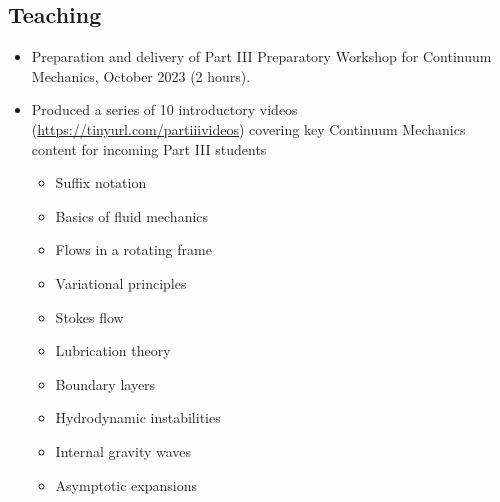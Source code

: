 \documentclass[a4paper]{article}
\begin{document}
    \begin{multicols}{2}
        \subsection*{Teaching}
            \begin{itemize}
                \item Preparation and delivery of Part III Preparatory Workshop for Continuum Mechanics, October 2023 (2 hours).\vspace{-0.5em}
                \item Produced a series of 10 introductory videos (\href{https://tinyurl.com/partiiivideos}{https://tinyurl.com/partiiivideos}) covering key Continuum Mechanics content for incoming Part III students
                    \begin{multicols}{2}
                        \begin{small}
                        \begin{itemize}
                            \item Suffix notation\vspace{-0.5em}
                            \item Basics of fluid mechanics\vspace{-0.5em}
                            \item Flows in a rotating frame\vspace{-0.5em}
                            \item Variational principles\vspace{-0.5em}
                            \item Stokes flow\vspace{-0.5em}
                            \item Lubrication theory\vspace{-0.5em}
                            \item Boundary layers\vspace{-0.5em}
                            \item Hydrodynamic instabilities\vspace{-0.5em}
                            \item Internal gravity waves\vspace{-0.5em}
                            \item Asymptotic expansions\vspace{-0.5em}
                        \end{itemize}

\end{small}
\end{multicols}
\end{itemize}
\end{multicols}
\end{document}
